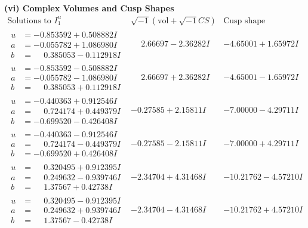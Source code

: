 \documentclass[1p]{elsarticle_modified}
\theoremstyle{definition}
\newcommand{\I}{\sqrt{-1}}
\begin{document}
\newpage\flushleft \textbf{(vi) Complex Volumes and Cusp Shapes}
$$\begin{array}{c|c|c}  
\text{Solutions to }I^u_{1}& \I (\text{vol} + \sqrt{-1}CS) & \text{Cusp shape}\\
 \hline 
\begin{aligned}
u &= -0.853592 + 0.508882 I \\
a &= -0.055782 + 1.086980 I \\
b &= \phantom{-}0.385053 - 0.112918 I\end{aligned}
 & \phantom{-}2.66697 - 2.36282 I & -4.65001 + 1.65972 I \\ \hline\begin{aligned}
u &= -0.853592 - 0.508882 I \\
a &= -0.055782 - 1.086980 I \\
b &= \phantom{-}0.385053 + 0.112918 I\end{aligned}
 & \phantom{-}2.66697 + 2.36282 I & -4.65001 - 1.65972 I \\ \hline\begin{aligned}
u &= -0.440363 + 0.912546 I \\
a &= \phantom{-}0.724174 + 0.449379 I \\
b &= -0.699520 - 0.426408 I\end{aligned}
 & -0.27585 + 2.15811 I & -7.00000 - 4.29711 I \\ \hline\begin{aligned}
u &= -0.440363 - 0.912546 I \\
a &= \phantom{-}0.724174 - 0.449379 I \\
b &= -0.699520 + 0.426408 I\end{aligned}
 & -0.27585 - 2.15811 I & -7.00000 + 4.29711 I \\ \hline\begin{aligned}
u &= \phantom{-}0.320495 + 0.912395 I \\
a &= \phantom{-}0.249632 - 0.939746 I \\
b &= \phantom{-}1.37567 + 0.42738 I\end{aligned}
 & -2.34704 + 4.31468 I & -10.21762 - 4.57210 I \\ \hline\begin{aligned}
u &= \phantom{-}0.320495 - 0.912395 I \\
a &= \phantom{-}0.249632 + 0.939746 I \\
b &= \phantom{-}1.37567 - 0.42738 I\end{aligned}
 & -2.34704 - 4.31468 I & -10.21762 + 4.57210 I \\ \hline\begin{aligned}

\end{aligned}
\end{array}$$
\end{document}
